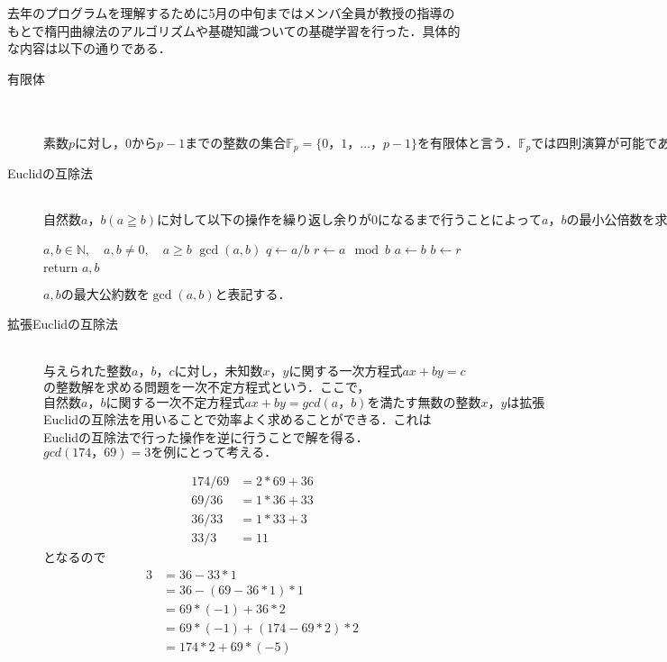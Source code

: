 \documentclass[openany,11pt,papersize]{jsbook}
\begin{document}
去年のプログラムを理解するために5月の中旬まではメンバ全員が教授の指導のもとで楕円曲線法のアルゴリズムや基礎知識ついての基礎学習を行った．具体的な内容は以下の通りである．
\begin{description}
 \item[有限体]\mbox{}\\ 
	    　　$素数pに対し，0からp-1までの整数の集合\mathbb{F}_p=\{0，1，…，p-1\}を有限体と言う．\mathbb{F}_pでは四則演算が可能であり，ECMではこの範囲で考える．$
 \item[Euclidの互除法]\mbox{}\\
		$自然数a，b(a≧b)に対して以下の操作を繰り返し余りが0になるまで行うことによってa，bの最小公倍数を求めるものである．$

\begin{algorithm}[h]                   
\caption{Euclidean Algorithm}
\label{alg E}                          
\begin{algorithmic}                  
\REQUIRE $a,b \in \mathbb{N} , \quad a,b \neq 0,\quad a\ge b$
\ENSURE $\gcd (a,b)$
\STATE $q \leftarrow a/b$
\STATE $r \leftarrow a\mod b$
\STATE $a \leftarrow b$
\STATE $b \leftarrow r$
\ENDWHILE
\STATE return $a,b$
\end{algorithmic}
\end{algorithm}
$a,bの最大公約数を\gcd (a,b)と表記する．$
	
 \item[拡張Euclidの互除法]\mbox{}\\
	$与えられた整数a，b，cに対し，未知数x，yに関する一次方程式ax+by=c$の整数解を求める問題を一次不定方程式という．ここで，$自然数a，bに関する一次不定方程式ax+by=gcd(a，b)を満たす無数の整数x，yは拡張$Euclidの互除法を用いることで効率よく求めることができる．これはEuclidの互除法で行った操作を逆に行うことで解を得る．$gcd(174，69)=3を例にとって考える．$

	\begin{align*} 
		174/69&=2*69+36 \\
		69/36&=1*36+33　\\
		36/33&=1*33+3 \\
		33/3&=11 	
 	\end{align*}
	となるので
	\begin{align*} 
	3&=36-33*1 \\
	&=36-(69-36*1)*1 \\
	&=69*(-1)+36*2 \\
	&=69*(-1)+(174-69*2)*2 \\
	&=174*2+69*(-5)
 	\end{align*}


\end{description}
\end{document}
